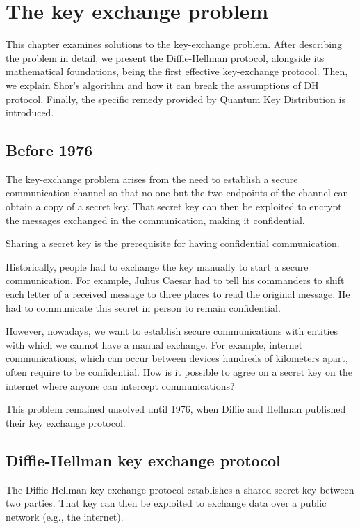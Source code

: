 \chapter{The key exchange problem}
\label{ch:chapter_1}%
This chapter examines solutions to the key-exchange problem. After describing the problem in detail, we present the Diffie-Hellman protocol, alongside its mathematical foundations, being the first effective key-exchange protocol. Then, we explain Shor's algorithm and how it can break the assumptions of DH protocol. Finally, the specific remedy provided by Quantum Key Distribution is introduced.

\section{Before 1976}
The key-exchange problem arises from the need to establish a secure communication channel so that no one but the two endpoints of the channel can obtain a copy of a secret key. That secret key can then be exploited to encrypt the messages exchanged in the communication, making it confidential.

Sharing a secret key is the prerequisite for having confidential communication.

Historically, people had to exchange the key manually to start a secure communication. For example, Julius Caesar had to tell his commanders to shift each letter of a received message to three places to read the original message. He had to communicate this secret in person to remain confidential.

However, nowadays, we want to establish secure communications with entities with which we cannot have a manual exchange. For example, internet communications, which can occur between devices hundreds of kilometers apart, often require to be confidential. How is it possible to agree on a secret key on the internet where anyone can intercept communications?

This problem remained unsolved until 1976, when Diffie and Hellman published their key exchange protocol.

\section{Diffie-Hellman key exchange protocol}
The Diffie-Hellman key exchange protocol \cite{dh76} establishes a shared secret key between two parties. That key can then be exploited to exchange data over a public network (e.g., the internet).

